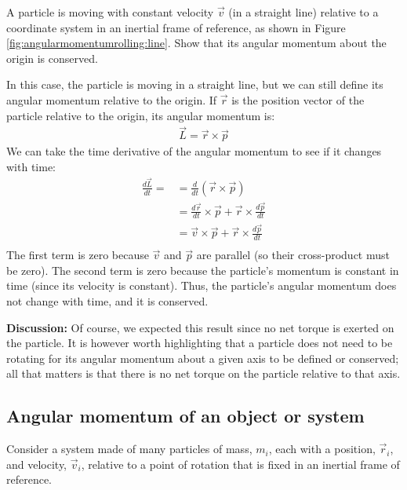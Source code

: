 \begin{example}{ A particle is moving with constant velocity $\vec v$ (in a straight line) relative to a coordinate system in an inertial frame of reference, as shown in Figure \ref{fig:angularmomentumrolling:line}. Show that its angular momentum about the origin is conserved. }

In this case, the particle is moving in a straight line, but we can still define its angular momentum relative to the origin. If $\vec r$ is the position vector of the particle relative to the origin, its angular momentum is:
\begin{align*}
\vec L = \vec r \times \vec p
\end{align*}
We can take the time derivative of the angular momentum to see if it changes with time:
\begin{align*}
\frac{d\vec L}{dt} = &= \frac{d}{dt} (\vec r\times \vec p)\\
&=\frac{d\vec r}{dt}\times \vec p + \vec r\times\frac{d\vec p}{dt}\\
&=\vec v\times \vec p + \vec r\times\frac{d\vec p}{dt}\\
\end{align*}
The first term is zero because $\vec v$ and $\vec p$ are parallel (so their cross-product must be zero). The second term is zero because the particle's momentum is constant in time (since its velocity is constant). Thus, the particle's angular momentum does not change with time, and it is conserved.  

\textbf{Discussion:} Of course, we expected this result since no net torque is exerted on the particle. It is however worth highlighting that a particle does not need to be rotating for its angular momentum about a given axis to be defined or conserved; all that matters is that there is no net torque on the particle relative to that axis.
\end{example} 
 
\subsection{Angular momentum of an object or system}
Consider a system made of many particles of mass, $m_i$, each with a position, $\vec r_i$, and velocity, $\vec v_i$, relative to a point of rotation that is fixed in an inertial frame of reference. 

